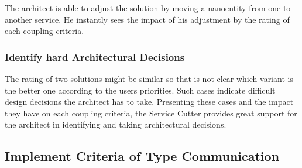 The architect is able to adjust the solution by moving a nanoentity from one to another service. He instantly sees the impact of his adjustment by the rating of each coupling criteria.

\subsubsection{Identify hard Architectural Decisions}

The rating of two solutions might be similar so that is not clear which variant is the better one according to the users priorities. Such cases indicate difficult design decisions the architect has to take. Presenting these cases and the impact they have on each coupling criteria, the Service Cutter provides great support for the architect in identifying and taking architectural decisions.

\subsection{Implement Criteria of Type Communication}
